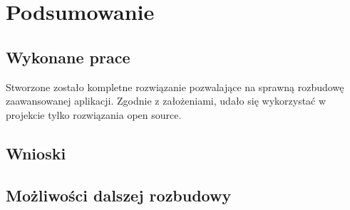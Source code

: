 \chapter{Podsumowanie}
	\section{Wykonane prace}
		Stworzone zostało kompletne rozwiązanie pozwalające na sprawną rozbudowę zaawansowanej aplikacji.
		Zgodnie z założeniami, udało się wykorzystać w projekcie tylko rozwiązania open source.
		
	\section{Wnioski}

	\section{Możliwości dalszej rozbudowy}